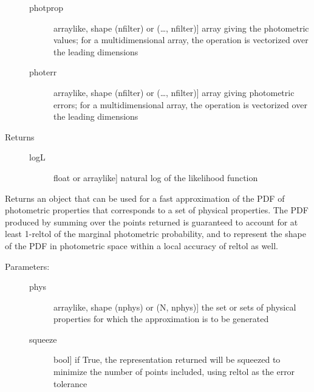 \documentclass[letterpaper,10pt,english]{sphinxmanual}
\begin{document}
\begin{fulllineitems}
\begin{fulllineitems}
\begin{description}
\begin{description}
\item[{photprop}] \leavevmode{[}arraylike, shape (nfilter) or (…, nfilter){]}
array giving the photometric values; for a
multidimensional array, the operation is vectorized over
the leading dimensions

\item[{photerr}] \leavevmode{[}arraylike, shape (nfilter) or (…, nfilter){]}
array giving photometric errors; for a multidimensional
array, the operation is vectorized over the leading
dimensions

\end{description}

\item[{Returns}] \leavevmode\begin{description}
\item[{logL}] \leavevmode{[}float or arraylike{]}
natural log of the likelihood function

\end{description}

\end{description}

\end{fulllineitems}


\begin{fulllineitems}
\label{\detokenize{bayesphot:slugpy.bayesphot.bp.bp.make_approx_phot}}
Returns an object that can be used for a fast approximation of
the PDF of photometric properties that corresponds to a set of
physical properties. The PDF produced by summing over the
points returned is guaranteed to account for at least 1-reltol
of the marginal photometric probability, and to represent the
shape of the PDF in photometric space within a local accuracy
of reltol as well.
\begin{description}
\item[{Parameters:}] \leavevmode\begin{description}
\item[{phys}] \leavevmode{[}arraylike, shape (nphys) or (N, nphys){]}
the set or sets of physical properties for which the
approximation is to be generated

\item[{squeeze}] \leavevmode{[}bool{]}
if True, the representation returned will be squeezed to
minimize the number of points included, using reltol as
the error tolerance


\end{description}
\end{description}
\end{fulllineitems}
\end{fulllineitems}
\end{document}
